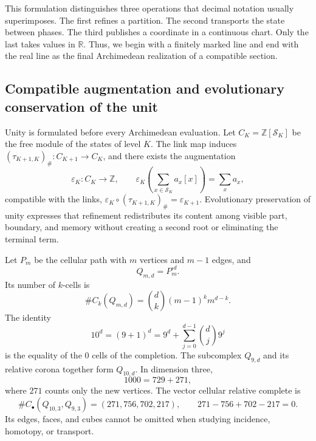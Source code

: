 This formulation distinguishes three operations that decimal notation
usually superimposes. The first refines a partition. The second transports the
state between phases. The third publishes a coordinate in a continuous chart.
Only the last takes values in \(\mathbb R\). Thus, we begin with a finitely
marked line and end with the real line as the final Archimedean realization
of a compatible section.

\subsection*{Compatible augmentation and evolutionary conservation of the unit}

Unity is formulated before every Archimedean evaluation. Let
\(C_K=\mathbb Z[\mathcal S_K]\) be the free module of the states of level
\(K\). The link map induces
\((\tau_{K+1,K})_\#:C_{K+1}\to C_K\), and there exists the augmentation
\[
 \varepsilon_K:C_K\longrightarrow\mathbb Z,\qquad
 \varepsilon_K\!\left(\sum_{x\in\mathcal S_K}a_x[x]\right)=\sum_xa_x,
\]
compatible with the links,
\(\varepsilon_K\circ(\tau_{K+1,K})_\#=\varepsilon_{K+1}\). Evolutionary preservation
of unity expresses that refinement redistributes its content among
visible part, boundary, and memory without creating a second root or eliminating the
terminal term.

Let \(P_m\) be the cellular path with \(m\) vertices and \(m-1\) edges, and
\[
 Q_{m,d}=P_m^{\square d}.
\]
Its number of \(k\)-cells is
\begin{equation}\label{p12-83-c0-s1:eq:horizonte-celdas-cubicas}
 \#C_k(Q_{m,d})=\binom dk(m-1)^k m^{d-k}.
\end{equation}
The identity
\begin{equation}\label{p12-83-c0-s1:eq:horizonte-completacion-binomial}
 10^d=(9+1)^d
     =9^d+\sum_{j=0}^{d-1}\binom dj9^j
\end{equation}
is the equality of the \(0\) cells of the completion. The subcomplex
\(Q_{9,d}\) and its relative corona together form \(Q_{10,d}\). In dimension
three,
\[
 1000=729+271,
\]
where \(271\) counts only the new vertices. The vector cellular
relative complete is
\begin{equation}\label{p12-83-c0-s1:eq:horizonte-corona-relativa}
 \#C_\bullet(Q_{10,3},Q_{9,3})=(271,756,702,217),
 \qquad 271-756+702-217=0.
\end{equation}
Its edges, faces, and cubes cannot be omitted when studying incidence,
homotopy, or transport.

